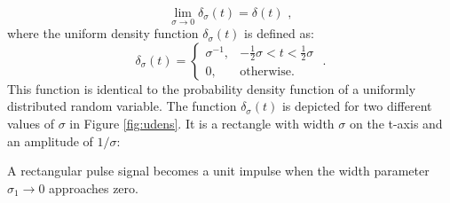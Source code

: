  \begin{equation}
    \lim_{\sigma \rightarrow 0} \delta_{\sigma}(t) = \delta(t)\,\,,
  \end{equation}
  where the uniform density function $\delta_{\sigma}(t)$ is defined as:
  \begin{equation}
    \delta_{\sigma}(t) =\left\{ \begin{array}{cl}
      \sigma^{-1}, & -\frac{1}{2}\sigma < t < \frac{1}{2}\sigma \\
      0,           & \mathrm{otherwise}.\end{array}
    \right.\,\,.
  \end{equation}
  This function is identical to the probability density function of a
  uniformly distributed random variable. The function
  $\delta_{\sigma}(t)$ is depicted for two different values of $\sigma$
  in Figure \ref{fig:udens}. It is a rectangle with width $\sigma$ on
  the t-axis and an amplitude of $1/\sigma$:
  \begin{marginfigure}
    \begin{center}
    \end{center}
    \caption{A rectangular pulse signal becomes a unit impulse when the width parameter $\sigma_1 \rightarrow 0$ approaches zero.}
    \label{fig:udens}
  \end{marginfigure}
\fi


